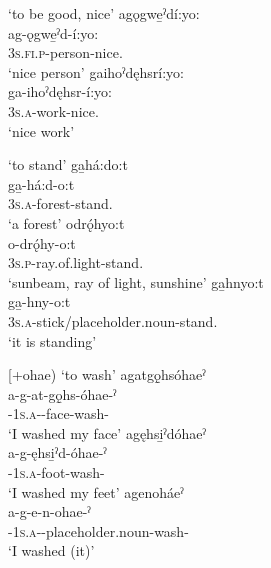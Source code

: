 \ea\label{ex:incverbex6}  ‘to be good, nice’
\ea agǫgwe̱ˀdí:yo:\\
\gll ag-ǫgwe̱ˀd-í:yo:\\
 \textsc{3s.fi.p}-person-nice.{\stative}\\
\glt `nice person'
\ex gaihoˀdęhsrí:yo:\\
\gll ga-ihoˀdęhsr-í:yo:\\
 \textsc{3s.a}-work-nice.{\stative}\\
\glt `nice work'
\z
\z

\ea\label{ex:incverbex7}  ‘to stand’
\ea ga̱há:do:t\\
\gll ga̱-há:d-o:t\\
 \textsc{3s.a}-forest-stand.{\stative}\\
\glt `a forest'
\ex odrǫ́hyo:t\\
\gll o-drǫ́hy-o:t\\
 \textsc{3s.p}-ray.of.light-stand.{\stative}\\
\glt `sunbeam, ray of light, sunshine'
\ex ga̱hnyo:t\\
\gll ga̱-hny-o:t\\
 \textsc{3s.a}-stick/placeholder.noun-stand.{\stative}\\
\glt `it is standing'
\z
\z

\ea\label{ex:incverbex8} [+ohae) ‘to wash’
\ea agatgǫ̱hsóhaeˀ\\
\gll a-g-at-gǫ̱hs-óhae-ˀ\\
 {\factual}-\textsc{1s.a}-{\semireflexive}-face-wash-{\punctual}\\
\glt `I washed my face'
\ex agęhsi̱ˀdóhaeˀ\\
\gll a-g-ęhsi̱ˀd-óhae-ˀ\\
 {\factual}-\textsc{1s.a}-foot-wash-{\punctual}\\
\glt `I washed my feet'
\ex agenoháeˀ\\
\gll a-g-e-n-ohae-ˀ\\
 {\factual}-\textsc{1s.a}-{\joinerE}-placeholder.noun-wash-{\punctual}\\
\glt `I washed (it)'
\z
\z
